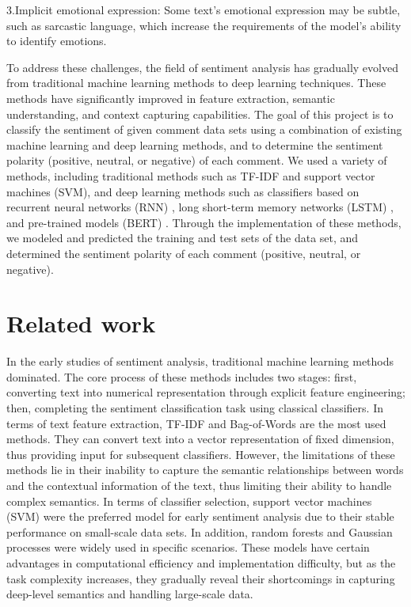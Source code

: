 \documentclass{article}
\begin{document}
 3.Implicit emotional expression: Some text's emotional expression may be subtle, such as sarcastic language, which increase the requirements of the model's ability to identify emotions.

To address these challenges, the field of sentiment analysis has gradually evolved from traditional machine learning methods to deep learning techniques. These methods have significantly improved in feature extraction, semantic understanding, and context capturing capabilities. The goal of this project is to classify the sentiment of given comment data sets using a combination of existing machine learning and deep learning methods, and to determine the sentiment polarity (positive, neutral, or negative) of each comment. We used a variety of methods, including traditional methods such as TF-IDF {\color{blue}{[1]}} and support vector machines (SVM){\color{blue}{[2]}}{\color{blue}{[3]}}{\color{blue}{[4]}}, and deep learning methods such as classifiers based on recurrent neural networks (RNN) {\color{blue}{[5]}}{\color{blue}{[6]}}, long short-term memory networks (LSTM) {\color{blue}{[7]}}{\color{blue}{[8]}}, and pre-trained models (BERT) {\color{blue}{[9]}}. Through the implementation of these methods, we modeled and predicted the training and test sets of the data set, and determined the sentiment polarity of each comment (positive, neutral, or negative).

\section{Related work}

\hypertarget{hpa.2}{{}}In the early studies of sentiment analysis, traditional machine learning methods dominated. The core process of these methods includes two stages: first, converting text into numerical representation through explicit feature engineering; then, completing the sentiment classification task using classical classifiers. In terms of text feature extraction, TF-IDF and Bag-of-Words are the most used methods. They can convert text into a vector representation of fixed dimension, thus providing input for subsequent classifiers. However, the limitations of these methods lie in their inability to capture the semantic relationships between words and the contextual information of the text, thus limiting their ability to handle complex semantics. In terms of classifier selection, support vector machines (SVM) were the preferred model for early sentiment analysis due to their stable performance on small-scale data sets. In addition, random forests {\color{blue}{[4]}}{\color{blue}{[10]}} and Gaussian processes {\color{blue}{[11]}}{\color{blue}{[12]}} were widely used in specific scenarios. These models have certain advantages in computational efficiency and implementation difficulty, but as the task complexity increases, they gradually reveal their shortcomings in capturing deep-level semantics and handling large-scale data.
\end{document}
